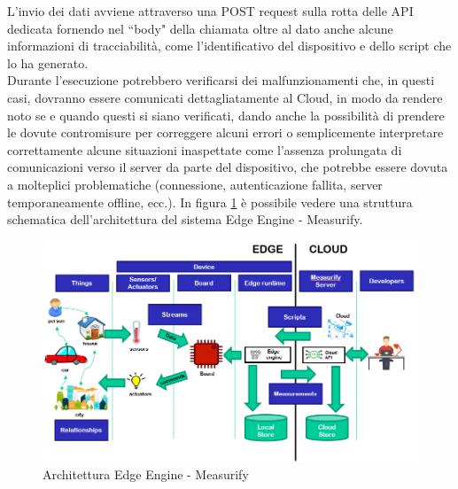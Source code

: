 L'invio dei dati avviene attraverso una POST request sulla rotta delle API dedicata fornendo nel “body" della chiamata oltre al dato anche alcune informazioni di tracciabilità, come l'identificativo del dispositivo e dello script che lo ha generato.\\
Durante l’esecuzione potrebbero verificarsi dei malfunzionamenti che, in questi casi, dovranno essere comunicati dettagliatamente al Cloud, in modo da rendere noto se e quando questi si siano verificati, dando anche la possibilità di prendere le dovute contromisure per correggere alcuni errori o semplicemente interpretare correttamente alcune situazioni inaspettate come l'assenza prolungata di comunicazioni verso il server da parte del dispositivo, che potrebbe essere dovuta a molteplici problematiche (connessione, autenticazione fallita, server temporaneamente offline, ecc.).
In figura \ref{edgecloud} è possibile vedere una struttura schematica dell'architettura del sistema Edge Engine - Measurify.
\begin{figure}[H]
	\centering
	\includegraphics[width=\linewidth, height= 0.35 \textheight]{pics/edgearch}
	\caption{Architettura Edge Engine - Measurify}
	\label{edgecloud}
\end{figure}
\newpage
